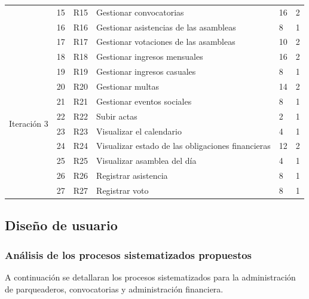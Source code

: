 \begin{spacing}{1}
\begin{center}
\begin{longtable}[l]{|p{}|p{}|p{}|p{}| p{}|p{}| }
             & 15 & R15 & Gestionar convocatorias & 16 & 2 \\
            \cline{2-6}
             & 16 & R16 & Gestionar asistencias de las asambleas & 8 & 1 \\
            \cline{2-6}
             & 17 & R17 & Gestionar votaciones de las asambleas & 10 & 2 \\
            \hline
            \multirow{10}{*}{Iteración 3} & 18 & R18 & Gestionar ingresos mensuales & 16 & 2 \\
            \cline{2-6}
             & 19 & R19 & Gestionar ingresos casuales & 8 & 1 \\
            \cline{2-6}
             & 20 & R20 & Gestionar multas & 14 & 2 \\
            \cline{2-6}
             & 21 & R21 & Gestionar eventos sociales & 8 & 1 \\
            \cline{2-6}
             & 22 & R22 & Subir actas & 2 & 1 \\
            \cline{2-6}
             & 23 & R23 & Visualizar el calendario & 4 & 1 \\
            \cline{2-6}
             & 24 & R24 & Visualizar estado de las obligaciones financieras & 12 & 2 \\
            \cline{2-6}
             & 25 & R25 & Visualizar asamblea del día & 4 & 1 \\
            \cline{2-6}
             & 26 & R26 & Registrar asistencia & 8 & 1 \\
            \cline{2-6}
             & 27 & R27 & Registrar voto & 8 & 1 \\
            \hline
        \end{longtable}
    \end{center}
\end{spacing}

\subsection{Diseño de usuario} \label{subsec:diseno-usuario}
\subsubsection{Análisis de los procesos sistematizados propuestos}

A continuación se detallaran los procesos sistematizados para la administración de parqueaderos, convocatorias y administración financiera.

